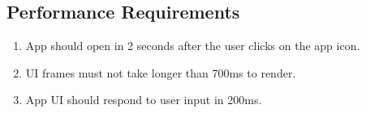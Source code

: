 \documentclass[../report.tex]{subfiles}
\begin{document}
\subsection{Performance Requirements}
\begin{enumerate}
\item App should open in 2 seconds after the user clicks on the app icon.
\item UI frames must not take longer than 700ms to render.
\item App UI should respond to user input in 200ms.
\end{enumerate}
\end{document}
